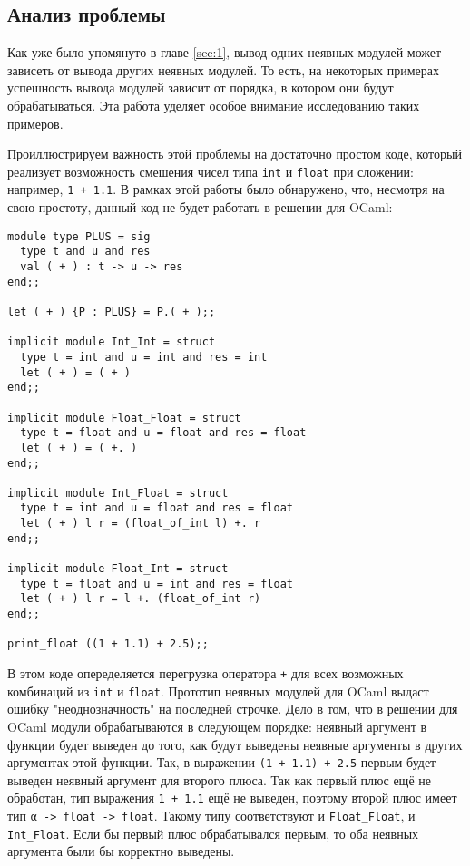 \documentclass[../diploma.tex]{subfiles}
\begin{document}
\label{sec:3}

\subsection{Анализ проблемы}

Как уже было упомянуто в главе \ref{sec:1}, вывод одних неявных модулей может зависеть от вывода других неявных модулей. То есть, на некоторых примерах успешность вывода модулей зависит от порядка, в котором они будут обрабатываться. Эта работа уделяет особое внимание исследованию таких примеров.

Проиллюстрируем важность этой проблемы на достаточно простом коде, который реализует возможность смешения чисел типа \texttt{int} и \texttt{float} при сложении: например, \texttt{1 + 1.1}. В рамках этой работы было обнаружено, что, несмотря на свою простоту, данный код не будет работать в решении для OCaml:

\begin{verbatim}
module type PLUS = sig
  type t and u and res
  val ( + ) : t -> u -> res
end;;

let ( + ) {P : PLUS} = P.( + );;

implicit module Int_Int = struct
  type t = int and u = int and res = int
  let ( + ) = ( + )
end;;

implicit module Float_Float = struct
  type t = float and u = float and res = float
  let ( + ) = ( +. )
end;;

implicit module Int_Float = struct
  type t = int and u = float and res = float
  let ( + ) l r = (float_of_int l) +. r
end;;

implicit module Float_Int = struct
  type t = float and u = int and res = float
  let ( + ) l r = l +. (float_of_int r)
end;;

print_float ((1 + 1.1) + 2.5);;
\end{verbatim}

В этом коде опеределяется перегрузка оператора \texttt{+} для всех возможных комбинаций из \texttt{int} и \texttt{float}. Прототип неявных модулей для OCaml выдаст ошибку "неоднозначность" на последней строчке. Дело в том, что в решении для OCaml модули обрабатываются в следующем порядке: неявный аргумент в функции будет выведен до того, как будут выведены неявные аргументы в других аргументах этой функции. Так, в выражении \texttt{(1 + 1.1) + 2.5} первым будет выведен неявный аргумент для второго плюса. Так как первый плюс ещё не обработан, тип выражения \texttt{1 + 1.1} ещё не выведен, поэтому второй плюс имеет тип \texttt{α -> float -> float}. Такому типу соответствуют и \texttt{Float_Float}, и \texttt{Int_Float}. Если бы первый плюс обрабатывался первым, то оба неявных аргумента были бы корректно выведены.
\end{document}
